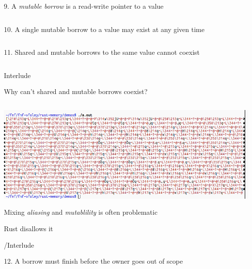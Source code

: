 \documentclass[9pt]{beamer}
\renewcommand\big[1]{
  \begin{center}
    \Large{#1}
  \end{center}
}
\begin{document}
\begin{frame}
  \big{9. A \emph{mutable borrow} is a read-write pointer to a value}
\end{frame}

\begin{frame}[fragile]
  \inputminted{rust}{demos/07_mut_borrow.rs}
\end{frame}

\begin{frame}
  \big{10. A single mutable borrow to a value may exist at any given time}
\end{frame}

\begin{frame}[fragile]
  \inputminted{rust}{demos/08_single_mut_borrow.rs}
\end{frame}

\begin{frame}
  \big{11. Shared and mutable borrows to the same value cannot coexist}
\end{frame}

\begin{frame}[fragile]
  \inputminted{rust}{demos/09_mutex_borrows.rs}
\end{frame}

\begin{frame}
  \centering\Huge{Interlude}

  \big{Why can't shared and mutable borrows coexist?}
\end{frame}

\begin{frame}[fragile]
  \inputminted{c++}{demos/interlude.cpp}
\end{frame}

\begin{frame}
  \centering\includegraphics[scale=0.32]{demos/boom.png}
\end{frame}

\begin{frame}
  \big{Mixing \emph{aliasing} and \emph{mutablility} is often problematic}

  \big{Rust disallows it}

  \centering\Huge{/Interlude}
\end{frame}

\begin{frame}
  \big{12. A borrow must finish before the owner goes out of scope}
\end{frame}

\begin{frame}[fragile]
  \inputminted{rust}{demos/10_too_long.rs}
\end{frame}
\end{document}
